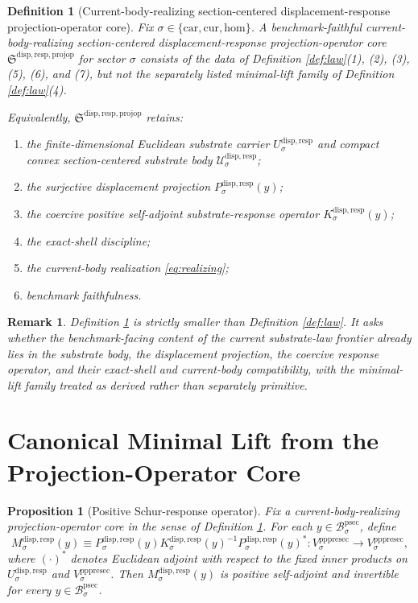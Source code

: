 \documentclass[11pt]{article}
\newcommand{\Car}{\mathrm{car}}
\newcommand{\Cur}{\mathrm{cur}}
\newcommand{\Hom}{\mathrm{hom}}
\newcommand{\ProtoSectionBody}[1]{\mathcal B_{#1}^{\mathrm{psec}}}
\newcommand{\PrePreProtoSectionVertical}[1]{V_{#1}^{\mathrm{pppresec}}}
\newcommand{\ProjectionOperatorCore}{\mathfrak S^{\mathrm{disp,resp,projop}}}
\newcommand{\SubstrateCarrier}[1]{U_{#1}^{\mathrm{disp,resp}}}
\newcommand{\SubstrateBody}[1]{\mathcal U_{#1}^{\mathrm{disp,resp}}}
\newcommand{\SubstrateProjection}[1]{P_{#1}^{\mathrm{disp,resp}}}
\newcommand{\SubstrateOperator}[1]{K_{#1}^{\mathrm{disp,resp}}}
\newcommand{\SchurResponse}[1]{M_{#1}^{\mathrm{disp,resp}}}
\newtheorem{definition}{Definition}
\newtheorem{proposition}{Proposition}
\newtheorem{remark}{Remark}
\begin{document}
\begin{definition}[Current-body-realizing section-centered displacement-response projection-operator core]
\label{def:core}
Fix \(\sigma\in\{\Car,\Cur,\Hom\}\). A \emph{benchmark-faithful current-body-realizing section-centered displacement-response projection-operator core} \(\ProjectionOperatorCore\) for sector \(\sigma\) consists of the data of Definition \ref{def:law}(1), (2), (3), (5), (6), and (7), but \emph{not} the separately listed minimal-lift family of Definition \ref{def:law}(4).

Equivalently, \(\ProjectionOperatorCore\) retains:
\begin{enumerate}
    \item the finite-dimensional Euclidean substrate carrier \(\SubstrateCarrier{\sigma}\) and compact convex section-centered substrate body \(\SubstrateBody{\sigma}\);
    \item the surjective displacement projection \(\SubstrateProjection{\sigma}(y)\);
    \item the coercive positive self-adjoint substrate-response operator \(\SubstrateOperator{\sigma}(y)\);
    \item the exact-shell discipline;
    \item the current-body realization \eqref{eq:realizing};
    \item benchmark faithfulness.
\end{enumerate}
\end{definition}

\begin{remark}
Definition \ref{def:core} is strictly smaller than Definition \ref{def:law}. It asks whether the benchmark-facing content of the current substrate-law frontier already lies in the substrate body, the displacement projection, the coercive response operator, and their exact-shell and current-body compatibility, with the minimal-lift family treated as derived rather than separately primitive.
\end{remark}

\section{Canonical Minimal Lift from the Projection-Operator Core}

\begin{proposition}[Positive Schur-response operator]
\label{prop:schur}
Fix a current-body-realizing projection-operator core in the sense of Definition \ref{def:core}. For each \(y\in\ProtoSectionBody{\sigma}\), define
\[
\SchurResponse{\sigma}(y)
\equiv
\SubstrateProjection{\sigma}(y)
\SubstrateOperator{\sigma}(y)^{-1}
\SubstrateProjection{\sigma}(y)^*:
\PrePreProtoSectionVertical{\sigma}\to\PrePreProtoSectionVertical{\sigma},
\]
where \((\cdot)^*\) denotes Euclidean adjoint with respect to the fixed inner products on \(\SubstrateCarrier{\sigma}\) and \(\PrePreProtoSectionVertical{\sigma}\). Then \(\SchurResponse{\sigma}(y)\) is positive self-adjoint and invertible for every \(y\in\ProtoSectionBody{\sigma}\).
\end{proposition}
\end{document}
